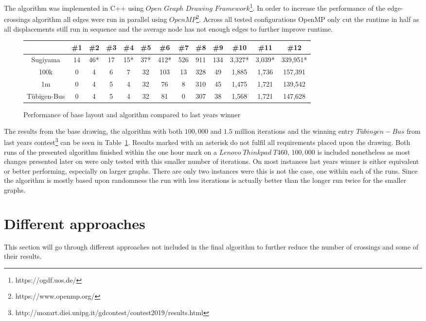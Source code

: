 \documentclass[]{llncs}
\begin{document}
\medskip
The algorithm was implemented in C++ using $Open$ $Graph$ $Drawing$ $Framework$\footnote{https://ogdf.uos.de/}. In order to increase the performance of the edge-crossings algorithm all edges were run in parallel using $OpenMP$\footnote{https://www.openmp.org/}. Across all tested configurations OpenMP only cut the runtime in half as all displacements still run in sequence and the average node has not enough edges to further improve runtime.

\begin{figure}
\centering
\begin{tabular}{|c|c|c|c|c|c|c|c|c|c|c|c|c|}
	\hline 
	& \#1 & \#2 & \#3 & \#4 & \#5 & \#6 & \#7 & \#8 & \#9 & \#10 & \#11 & \#12 \\
	\hline 
    Sugiyama & 14 & 46* & 17 & 15* & 37* & 412* & 526 & 911 & 134 & 3,327* & 3,039* & 339,951* \\  
	\hline
	100k & 0 & 4 & 6 & 7 & 32 & 103 & 13 & 328 & 49 & 1,885 & 1,736 & 157,391 \\
	\hline
	1m & 0 & 4 & 5 & 4 & 32 & 76 & 8 & 310 & 45 & 1,475 & 1,721 & 139,542 \\
	\hline
	Tübigen-Bus & 0 & 4 & 5 & 4 & 32 & 81 & 0 & 307 & 38 & 1,568 & 1,721 & 147,628 \\
	\hline 
\end{tabular}
\caption{Performance of base layout and algorithm compared to last years winner}
\label{best-res}
\end{figure}

The results from the base drawing, the algorithm with both $100,000$ and $1.5$ million iterations and the winning entry $Tübingen-Bus$ from last years contest\footnote{http://mozart.diei.unipg.it/gdcontest/contest2019/results.html} can be seen in Table~\ref{best-res}. Results marked with an asterisk do not fulfil all requirements placed upon the drawing. Both runs of the presented algorithm finished within the one hour mark on a $Lenovo\;Thinkpad\;T460$, $100,000$ is included nonetheless as most changes presented later on were only tested with this smaller number of iterations. On most instances last years winner is either equivalent or better performing, especially on larger graphs. There are only two instances were this is not the case, one within each of the runs. Since the algorithm is mostly based upon randomness the run with less iterations is actually better than the longer run twice for the smaller graphs.

	\section{Different approaches}
	This section will go through different approaches not included in the final algorithm to further reduce the number of crossings and some of their results.
\end{document}
